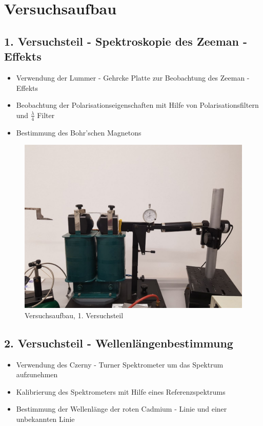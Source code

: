 
\section{Versuchsaufbau}

    \subsection{1. Versuchsteil - Spektroskopie des Zeeman - Effekts}
        \begin{myframe}{\subsecname}
            \begin{itemize}
                \item Verwendung der Lummer - Gehrcke Platte zur Beobachtung des Zeeman - Effekts
                \item Beobachtung der Polarisationseigenschaften mit Hilfe von Polarisationsfiltern und $\frac{\lambda}{4}$ Filter
                \item Bestimmung des Bohr'schen Magnetons
            \end{itemize}
        \end{myframe}

        \begin{myframe}{\subsecname}
            \begin{figure}
                \includegraphics[width=0.6\linewidth]{img/IMG-20180102-WA0000.jpg}
                \caption{Versuchsaufbau, 1. Versuchsteil}
            \end{figure}
        \end{myframe}


    \subsection{2. Versuchsteil - Wellenlängenbestimmung}
        \begin{myframe}{\subsecname}
            \begin{itemize}
                \item Verwendung des Czerny - Turner Spektrometer um das Spektrum aufzunehmen
                \item Kalibrierung des Spektrometers mit Hilfe eines Referenzspektrums
                \item Bestimmung der Wellenlänge der roten Cadmium - Linie und einer unbekannten Linie
            \end{itemize}
        \end{myframe}


